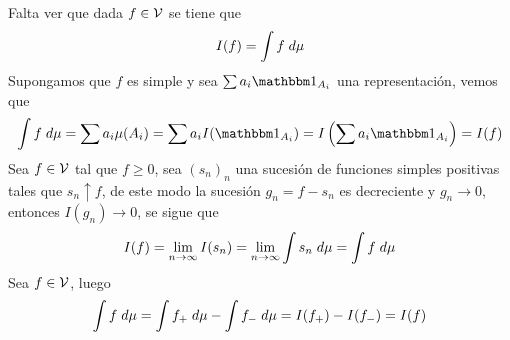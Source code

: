 \documentclass{article}
\begin{document}
\begin{enumerate}
    \vspace{4mm}
    \noindent Falta ver que dada $f\in\mathcal{V}$ se tiene que
    \begin{equation*}
        I(f)=\int f\hspace{1mm}d\mu
    \end{equation*}
    Supongamos que $f$ es simple y sea $\sum a_{i}\I_{A_{i}}$ una representación, vemos que
    \begin{equation*}
        \int f\hspace{1mm}d\mu=\sum a_{i}\mu(A_{i})=\sum a_{i}I(\I_{A_{i}})
        =I\left(\sum a_{i}\I_{A_{i}}\right)=I(f)
    \end{equation*}
    Sea $f\in\mathcal{V}$ tal que $f\geq0$, sea $(s_{n})_{n}$ una sucesión de funciones simples positivas
    tales que $s_{n}\uparrow f$, de este modo la sucesión $g_{n}=f-s_{n}$ es decreciente y 
    $g_{n}\to0$, entonces $I(g_{n})\to0$, se sigue que
    \begin{equation*}
        I(f)=\lim\limits_{n\to\infty}I(s_{n})=\lim\limits_{n\to\infty}\int s_{n}\hspace{1mm}d\mu
        =\int f\hspace{1mm}d\mu
    \end{equation*}
    Sea $f\in\mathcal{V}$, luego
    \begin{equation*}
        \int f\hspace{1mm}d\mu=\int f_{+}\hspace{1mm}d\mu-\int f_{-}\hspace{1mm}d\mu
        =I(f_{+})-I(f_{-})=I(f)
    \end{equation*}
\end{enumerate}

\end{document}
